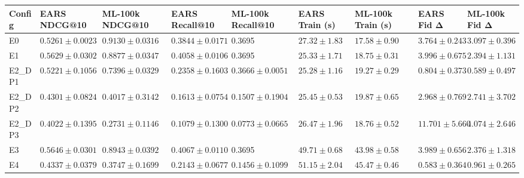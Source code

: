 \begin{tabular}{lllllllll}
\toprule
Config & EARS NDCG@10 & ML-100k NDCG@10 & EARS Recall@10 & ML-100k Recall@10 & EARS Train (s) & ML-100k Train (s) & EARS Fid Δ & ML-100k Fid Δ \\
\midrule
E0 & $0.5261 \pm 0.0023$ & $0.9130 \pm 0.0316$ & $0.3844 \pm 0.0171$ & 0.3695 & $27.32 \pm 1.83$ & $17.58 \pm 0.90$ & $3.764 \pm 0.243$ & $3.097 \pm 0.396$ \\
E1 & $0.5629 \pm 0.0302$ & $0.8877 \pm 0.0347$ & $0.4058 \pm 0.0106$ & 0.3695 & $25.33 \pm 1.71$ & $18.75 \pm 0.31$ & $3.996 \pm 0.675$ & $2.394 \pm 1.131$ \\
E2_DP1 & $0.5221 \pm 0.1056$ & $0.7396 \pm 0.0329$ & $0.2358 \pm 0.1603$ & $0.3666 \pm 0.0051$ & $25.28 \pm 1.16$ & $19.27 \pm 0.29$ & $0.804 \pm 0.373$ & $0.589 \pm 0.497$ \\
E2_DP2 & $0.4301 \pm 0.0824$ & $0.4017 \pm 0.3142$ & $0.1613 \pm 0.0754$ & $0.1507 \pm 0.1904$ & $25.45 \pm 0.53$ & $19.87 \pm 0.65$ & $2.968 \pm 0.769$ & $2.741 \pm 3.702$ \\
E2_DP3 & $0.4022 \pm 0.1395$ & $0.2731 \pm 0.1146$ & $0.1079 \pm 0.1300$ & $0.0773 \pm 0.0665$ & $26.47 \pm 1.96$ & $18.76 \pm 0.52$ & $11.701 \pm 5.660$ & $4.074 \pm 2.646$ \\
E3 & $0.5646 \pm 0.0301$ & $0.8943 \pm 0.0392$ & $0.4067 \pm 0.0110$ & 0.3695 & $49.71 \pm 0.68$ & $43.98 \pm 0.58$ & $3.989 \pm 0.656$ & $2.376 \pm 1.318$ \\
E4 & $0.4337 \pm 0.0379$ & $0.3747 \pm 0.1699$ & $0.2143 \pm 0.0677$ & $0.1456 \pm 0.1099$ & $51.15 \pm 2.04$ & $45.47 \pm 0.46$ & $0.583 \pm 0.364$ & $0.961 \pm 0.265$ \\
\bottomrule
\end{tabular}
